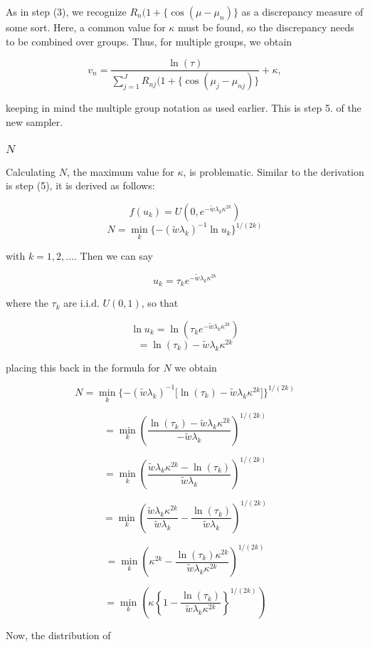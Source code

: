 \documentclass[12pt,a4paper]{article}
\begin{document}
As in step (3), we recognize $R_n(1+ \{ \cos(\mu - \mu_n) \}$ as a discrepancy measure of some sort. Here, a common value for $\kappa$ must be found, so the discrepancy needs to be combined over groups. Thus, for multiple groups, we obtain

$$ v_n = \frac{\ln (\tau) }{\sum_{j=1}^{J} R_{nj}(1 + \{ \cos(\mu_j - \mu_{nj}) \} } +  \kappa,$$

keeping in mind the multiple group notation as used earlier. This is step 5. of the new sampler.

\subsubsection{$N$}
Calculating $N$, the maximum value for $\kappa$, is problematic. Similar to the derivation is step (5), it is derived as follows:

$$ f(u_k) = U(0, e^{-\tilde{w}\lambda_k\kappa^{2k}})$$
$$ N = \min_k \{-(\tilde{w} \lambda_k )^{-1} \ln u_k\}^{1/(2k)}$$ 

with $k = 1, 2, ...$. Then we can say

$$ u_k = \tau_k e^{-\tilde{w}\lambda_k\kappa^{2k}} $$

where the $\tau_k$ are i.i.d. $U(0, 1)$, so that

$$ \ln u_k = \ln (\tau_k e^{-\tilde{w}\lambda_k\kappa^{2k}})  $$ 
$$ = \ln(\tau_k) -\tilde{w}\lambda_k\kappa^{2k} $$

placing this back in the formula for $N$ we obtain

$$ N = \min_k \{-(\tilde{w} \lambda_k )^{-1} \lbrack \ln(\tau_k) -\tilde{w}\lambda_k\kappa^{2k} \rbrack \}^{1/(2k)}$$ 

$$  = \min_k \left( \frac{\ln(\tau_k) -\tilde{w}\lambda_k\kappa^{2k}}{-\tilde{w} \lambda_k} \right)^{1/(2k)} $$

$$  = \min_k \left( \frac{\tilde{w}\lambda_k\kappa^{2k} - \ln(\tau_k)}{\tilde{w} \lambda_k} \right)^{1/(2k)} $$

$$  = \min_k \left( \frac{ \tilde{w}\lambda_k\kappa^{2k}}{\tilde{w} \lambda_k} - \frac{ \ln(\tau_k)}{\tilde{w} \lambda_k}  \right)^{1/(2k)} $$

$$  = \min_k \left(\kappa^{2k} - \frac{\ln(\tau_k)\kappa^{2k}}{\tilde{w} \lambda_k \kappa^{2k}}  \right)^{1/(2k)} $$

$$  = \min_k \left(\kappa \left\lbrace 1 - \frac{\ln(\tau_k)}{\tilde{w} \lambda_k \kappa^{2k}} \right\rbrace ^{1/(2k)} \right) $$


Now, the distribution of 
\end{document}
